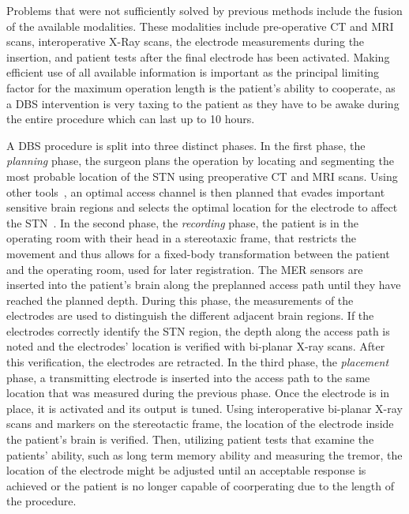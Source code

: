 Problems that were not sufficiently solved by previous methods include the fusion of the available modalities. These modalities include pre-operative CT and MRI scans, interoperative X-Ray scans, the electrode measurements during the insertion, and patient tests after the final electrode has been activated. Making efficient use of all available information is important as the principal limiting factor for the maximum operation length is the patient's ability to cooperate, as a DBS intervention is very taxing to the patient as they have to be awake during the entire procedure which can last up to 10 hours.

A DBS procedure is split into three distinct phases. In the first phase, the \emph{planning} phase, the surgeon plans the operation by locating and segmenting the most probable location of the STN using preoperative CT and MRI scans. Using other tools~\cite{Shamir2010}, an optimal access channel is then planned that evades important sensitive brain regions and selects the optimal location for the electrode to affect the STN~\cite{butson2007patient}. In the second phase, the \emph{recording} phase, the patient is in the operating room with their head in a stereotaxic frame, that restricts the movement and thus allows for a fixed-body transformation between the patient and the operating room, used for later registration. The MER sensors are inserted into the patient's brain along the preplanned access path until they have reached the planned depth. During this phase, the measurements of the electrodes are used to distinguish the different adjacent brain regions. If the electrodes correctly identify the STN region, the depth along the access path is noted and the electrodes' location is verified with bi-planar X-ray scans. After this verification, the electrodes are retracted. In the third phase, the \emph{placement} phase, a transmitting electrode is inserted into the access path to the same location that was measured during the previous phase. Once the electrode is in place, it is activated and its output is tuned. Using interoperative bi-planar X-ray scans and markers on the stereotactic frame, the location of the electrode inside the patient's brain is verified. Then, utilizing patient tests that examine the patients' ability, such as long term memory ability and measuring the tremor, the location of the electrode might be adjusted until an acceptable response is achieved or the patient is no longer capable of coorperating due to the length of the procedure.

